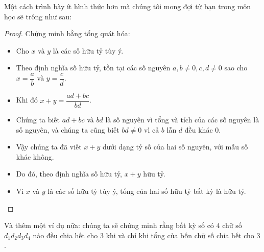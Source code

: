 Một cách trình bày ít hình thức hơn mà chúng tôi mong đợi từ bạn trong môn học sẽ trông như sau:

\begin{proof}
Chứng minh bằng tổng quát hóa:
\begin{itemize}
\item Cho $x$ và $y$ là các số hữu tỷ tùy ý.
\item Theo định nghĩa số hữu tỷ, tồn tại các số nguyên $a, b \neq 0, c, d \neq 0$ sao cho $x = \dfrac{a}{b}$ và $y = \dfrac{c}{d}$.
\item Khi đó $x + y = \dfrac{ad + bc}{bd}$.
\item Chúng ta biết $ad + bc$ và $bd$ là số nguyên vì tổng và tích của các số nguyên là số nguyên, và chúng ta cũng biết $bd \neq 0$ vì cả $b$ lẫn $d$ đều khác $0$.
\item Vậy chúng ta đã viết $x + y$ dưới dạng tỷ số của hai số nguyên, với mẫu số khác không.
\item Do đó, theo định nghĩa số hữu tỷ, $x + y$ hữu tỷ.
\item Vì $x$ và $y$ là các số hữu tỷ tùy ý, tổng của hai số hữu tỷ bất kỳ là hữu tỷ.
\end{itemize}
\end{proof}

Và thêm một ví dụ nữa: chúng ta sẽ chứng minh rằng bất kỳ số có $4$ chữ số $d_1d_2d_3d_4$ nào đều chia hết cho $3$ khi và chỉ khi tổng của bốn chữ số chia hết cho $3$.


